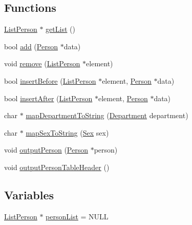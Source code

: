 \subsection*{Functions}
\begin{DoxyCompactItemize}
\item 
\hyperlink{struct_h_t_w_1_1_a_i_1_1_beleg_1_1_list_person}{List\-Person} $\ast$ \hyperlink{namespace_h_t_w_1_1_a_i_1_1_beleg_a60ff115fb18a8cf3198fcaccec5e3201}{get\-List} ()
\item 
bool \hyperlink{namespace_h_t_w_1_1_a_i_1_1_beleg_af6ed0d1b191a944ce94086733b37953e}{add} (\hyperlink{struct_h_t_w_1_1_a_i_1_1_beleg_1_1_person}{Person} $\ast$data)
\item 
void \hyperlink{namespace_h_t_w_1_1_a_i_1_1_beleg_a89cbff7fbe68e50ec5b0995d936060c1}{remove} (\hyperlink{struct_h_t_w_1_1_a_i_1_1_beleg_1_1_list_person}{List\-Person} $\ast$element)
\item 
bool \hyperlink{namespace_h_t_w_1_1_a_i_1_1_beleg_a481e955551f92cf8b4a08f598eaae9f3}{insert\-Before} (\hyperlink{struct_h_t_w_1_1_a_i_1_1_beleg_1_1_list_person}{List\-Person} $\ast$element, \hyperlink{struct_h_t_w_1_1_a_i_1_1_beleg_1_1_person}{Person} $\ast$data)
\item 
bool \hyperlink{namespace_h_t_w_1_1_a_i_1_1_beleg_af8912e7f8d03efe279d299cce708ea9b}{insert\-After} (\hyperlink{struct_h_t_w_1_1_a_i_1_1_beleg_1_1_list_person}{List\-Person} $\ast$element, \hyperlink{struct_h_t_w_1_1_a_i_1_1_beleg_1_1_person}{Person} $\ast$data)
\item 
char $\ast$ \hyperlink{namespace_h_t_w_1_1_a_i_1_1_beleg_a71374c8885c328cc86695031048d6f3a}{map\-Department\-To\-String} (\hyperlink{namespace_h_t_w_1_1_a_i_1_1_beleg_a1131bbbd225fb53b2082a014e0f6e940}{Department} department)
\item 
char $\ast$ \hyperlink{namespace_h_t_w_1_1_a_i_1_1_beleg_aa88237c539d44af6b297104e90f3fe4a}{map\-Sex\-To\-String} (\hyperlink{namespace_h_t_w_1_1_a_i_1_1_beleg_a79f3a46a934454a934cc7ec60d4f2e2c}{Sex} sex)
\item 
void \hyperlink{namespace_h_t_w_1_1_a_i_1_1_beleg_a0079743a47110e2ebbf1d1c0adc88a4f}{output\-Person} (\hyperlink{struct_h_t_w_1_1_a_i_1_1_beleg_1_1_person}{Person} $\ast$person)
\item 
void \hyperlink{namespace_h_t_w_1_1_a_i_1_1_beleg_a4a69303afeacbd64a2185c148f7b1862}{output\-Person\-Table\-Header} ()
\end{DoxyCompactItemize}
\subsection*{Variables}
\begin{DoxyCompactItemize}
\item 
\hyperlink{struct_h_t_w_1_1_a_i_1_1_beleg_1_1_list_person}{List\-Person} $\ast$ \hyperlink{namespace_h_t_w_1_1_a_i_1_1_beleg_a83e4fd1b9398faa1326da1af8261ee0a}{person\-List} = N\-U\-L\-L
\end{DoxyCompactItemize}


